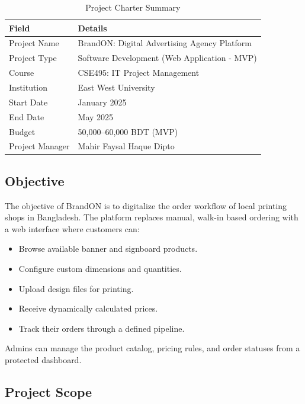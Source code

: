 \documentclass[12pt,a4paper]{report}
\begin{document}
\begin{table}[H]
  \centering
  \caption{Project Charter Summary}
  \begin{tabularx}{\textwidth}{L{3.5cm} X}
    \toprule
    \textbf{Field} & \textbf{Details} \\
    \midrule
    Project Name    & BrandON: Digital Advertising Agency Platform \\
    Project Type    & Software Development (Web Application - MVP) \\
    Course          & CSE495: IT Project Management \\
    Institution     & East West University \\
    Start Date      & January 2025 \\
    End Date        & May 2025 \\
    Budget          & 50,000--60,000 BDT (MVP) \\
    Project Manager & Mahir Faysal Haque Dipto \\
    \bottomrule
  \end{tabularx}
\end{table}

\subsection{Objective}

The objective of BrandON is to digitalize the order workflow of local printing shops in Bangladesh. The platform replaces manual, walk-in based ordering with a web interface where customers can:
\begin{itemize}
  \item Browse available banner and signboard products.
  \item Configure custom dimensions and quantities.
  \item Upload design files for printing.
  \item Receive dynamically calculated prices.
  \item Track their orders through a defined pipeline.
\end{itemize}

Admins can manage the product catalog, pricing rules, and order statuses from a protected dashboard.

\subsection{Project Scope}
\end{document}
